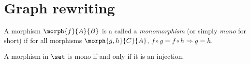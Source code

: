 \chapter{Graph rewriting}

\begin{definition}[Monomorphism]
    A morphism \(\morph{f}{A}{B}\) is a called a \emph{monomorphism} (or simply
    \emph{mono} for short) if for all morphisms \(\morph{g,h}{C}{A}\), \(
        f \circ g = f \circ h \Rightarrow g = h
    \).
\end{definition}

\begin{example}
    A morphism in \(\set\) is mono if and only if it is an injection.
\end{example}